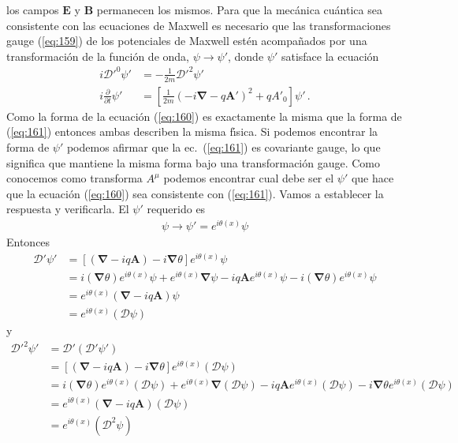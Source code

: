  los campos $\mathbf{E}$ y $\mathbf{B}$ permanecen los mismos. Para que la mec\'anica cu\'antica sea consistente con las ecuaciones de Maxwell es necesario que las transformaciones gauge (\ref{eq:159}) de los potenciales de Maxwell est\'en acompa\~nados por una transformaci\'on de la funci\'on de onda, $\psi\to\psi'$, donde $\psi'$ satisface la ecuaci\'on
\begin{align}
  \label{eq:160}
   i{\mathcal{D}'}^0\psi'&=-\frac{1}{2m}{\boldsymbol{\mathcal{D}}'}^2\psi'\nonumber\\
 i\frac{\partial}{\partial t}\psi'&=\left[\frac{1}{2m}(-i\mathbf{\nabla}-q\mathbf{A}')^2+q{A'}_0\right]\psi'\,.
\end{align}
Como la forma de la ecuaci\'on (\ref{eq:160}) es exactamente la misma que la forma de (\ref{eq:161}) entonces ambas describen la misma f\'\i sica. Si podemos encontrar la forma de $\psi'$ podemos afirmar que la ec.~(\ref{eq:161}) es covariante gauge, lo que significa que mantiene la misma forma bajo una transformaci\'on gauge. Como conocemos como transforma $A^\mu$ podemos encontrar cual debe ser el $\psi'$ que hace que la ecuaci\'on (\ref{eq:160}) sea consistente con (\ref{eq:161}). Vamos a establecer la respuesta y verificarla. El $\psi'$ requerido es
\begin{align}
  \psi\to \psi'=e^{i\theta(x)}\psi
\end{align}
Entonces
\begin{align}
  \boldsymbol{\mathcal{D}}'\psi'&=\left[(\boldsymbol{\nabla}-iq\mathbf{A})-i\boldsymbol{\nabla}\theta\right]e^{i\theta(x)}\psi\nonumber\\
  &=i(\boldsymbol{\nabla}\theta)e^{i\theta(x)}\psi+e^{i\theta(x)}\boldsymbol{\nabla}\psi-iq\mathbf{A}e^{i\theta(x)}\psi-i(\boldsymbol{\nabla}\theta) e^{i\theta(x)}\psi\nonumber\\
  &=e^{i\theta(x)}(\boldsymbol{\nabla}-iq\mathbf{A})\psi\nonumber\\
  &=e^{i\theta(x)}(\boldsymbol{\mathcal{D}}\psi)
\end{align}
y
\begin{align}
  {\boldsymbol{\mathcal{D}}'}^2\psi'&=\boldsymbol{\mathcal{D}}'(\boldsymbol{\mathcal{D}}'\psi')\nonumber\\
  &=\left[(\boldsymbol{\nabla}-iq\mathbf{A})-i\boldsymbol{\nabla}\theta\right]e^{i\theta(x)}(\boldsymbol{\mathcal{D}}\psi)\nonumber\\
  &=i(\boldsymbol{\nabla}\theta)e^{i\theta(x)}(\boldsymbol{\mathcal{D}}\psi)+e^{i\theta(x)}\boldsymbol{\nabla}(\boldsymbol{\mathcal{D}}\psi)
  -iq\mathbf{A}e^{i\theta(x)}(\boldsymbol{\mathcal{D}}\psi)-i\boldsymbol{\nabla}\theta e^{i\theta(x)}(\boldsymbol{\mathcal{D}}\psi)\nonumber\\
  &=e^{i\theta(x)}(\boldsymbol{\nabla}-iq\mathbf{A})(\boldsymbol{\mathcal{D}}\psi)\nonumber\\
  &=e^{i\theta(x)}(\boldsymbol{\mathcal{D}}^2\psi)
\end{align}

